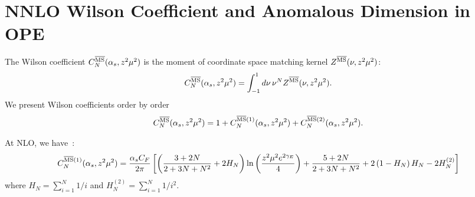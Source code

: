 \documentclass[prd,aps,twocolumn,preprintnumbers, showpacs, nofootinbib,superscriptaddress,notitlepage]{revtex4-2}
\def\bea{\begin{eqnarray}}
\def\eea{\end{eqnarray}}
\begin{document}
\section{NNLO Wilson Coefficient and Anomalous Dimension in OPE }\label{app:Wilcoe}

The Wilson coefficient $C^{\overline{\rm MS}}_{N}(\alpha_{s},z^2 \mu^2)$ is the moment of coordinate space matching kernel $Z^{\overline{\rm MS}}(\nu,z^2 \mu^2)$:
\bea
C^{\overline{\rm MS}}_{N}(\alpha_{s},z^2 \mu^2)=\int_{-1}^{1} d\nu \, \nu^N Z^{\overline{\rm MS}}(\nu,z^2 \mu^2).
\eea
We present Wilson coefficients order by order
\bea
C^{\overline{\rm MS}}_{N}(\alpha_{s},z^2 \mu^2)=1+C^{\overline{\rm MS}(1)}_{N}(\alpha_{s},z^2 \mu^2)+C^{\overline{\rm MS}(2)}_{N}(\alpha_{s},z^2 \mu^2).
\eea

At NLO, we have~\cite{Gao:2021hxl}:
\bea\label{eq:WilcoeNLO}
C^{\overline{\rm MS}(1)}_{N}(\alpha_{s},z^2 \mu^2)=\frac{\alpha_{s} C_{F}}{2 \pi}\left[\left(\frac{3+2 N}{2+3 N+N^{2}}+2 H_{N}\right) \ln \left(\frac{z^{2}\mu^{2}e^{2\gamma_E}}{4}\right)+\frac{5+2 N}{2+3 N+N^{2}}+2\left(1-H_{N}\right) H_{N}-2 H_{N}^{(2)}\right]
\eea
where $H_{N}=\sum_{i=1}^{N}1/i$ and $H_{N}^{(2)}=\sum_{i=1}^{N}1/i^2$.
\end{document}
